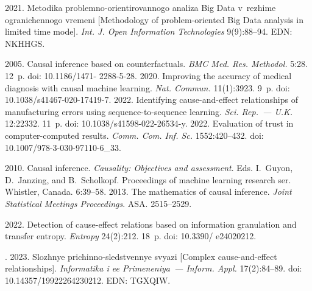   \begin{multicols}{2}

\renewcommand{\bibname}{\protect\rmfamily References}

{\small\frenchspacing
 {%
 \begin{thebibliography}{9} 
 2021. Metodika problemno-orientirovannogo analiza Big Data v~rezhime 
og\-ra\-ni\-chen\-no\-go vremeni [Methodology of problem-oriented Big Data analysis in limited time mode]. 
\textit{Int. J. Open Information Technologies} 9(9):88--94. EDN: \mbox{NKHHGS}.
{ %

}
 2005. Causal inference based on counterfactuals. \textit{BMC 
Med. Res. Methodol.} 5:28.  
12~p. doi: 10.1186/1471- 2288-5-28.
 2020. Improving the accuracy of medical diagnosis 
with causal machine learning. \textit{Nat. Commun.} 11(1):3923. 9~p. doi:  
10.1038/s41467-020-17419-7.
 2022. Identifying 
cause-and-effect relationships of manufacturing errors using sequence-to-sequence learning. 
\textit{Sci. Rep.~--- U.K.} 12:22332. 11~p. doi: 10.1038/s41598-022-26534-y.
 2022. Evaluation of trust in 
computer-computed results. \textit{Comm. Com. Inf. Sc.} 1552:420--432. doi:  
10.1007/978-3-030-97110-6\_33.

 2010. Causal inference. \textit{Causality: Objectives and assessment}. Eds. I.~Guyon, 
D.~Janzing, and B.~Scholkopf. Proceedings of machine learning research ser. Whistler, Canada.  
6:39--58. 
 2013. The mathematics of causal inference. \textit{Joint Statistical Meetings 
Proceedings}. ASA. 2515--2529.

 2022. Detection of cause-effect relations based on information 
granulation and transfer entropy. \textit{Entropy} 24(2):212. 18~p. doi: 10.3390/ e24020212.
 
. 2023. 
Slozhnye prichinno-sledstvennye svyazi [Complex cause-and-effect relationships]. 
\textit{Informatika i ee Primeneniya~--- Inform. \mbox{Appl.}} 17(2):84--89. doi: 10.14357/19922264230212. 
EDN: TGXQIW.
\end{thebibliography}

 }
 }

\end{multicols}

